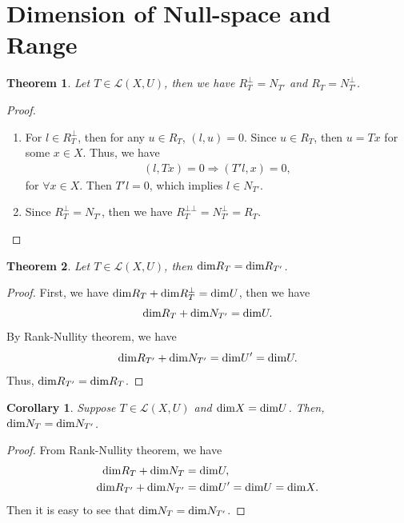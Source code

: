 \documentclass[11pt]{book}
\newtheorem{theorem}{Theorem}[chapter]
\newtheorem{corollary}{Corollary}[theorem]
\theoremstyle{definition}
\numberwithin{equation}{chapter}
\begin{document}
\section{Dimension of Null-space and Range}
\begin{theorem}\label{theorem_371}
Let $T\in \mathscr{L}(X,U)$, then we have $R_T^\bot = N_{T'}$ and $R_T = N_{T'}^\bot$.
\end{theorem}
\begin{proof}
~\begin{enumerate}[label=(\alph*)]
    \item For $l\in R_T^\bot$, then for any $u\in R_T$, $(l,u) = 0$. Since $u\in R_T$, then $u = T x$ for some $x\in X$. Thus, we have
    \begin{align*}
        (l, T x) = 0 \Rightarrow (T' l, x) = 0,
    \end{align*}
    for $\forall x\in X$. Then $T' l = 0$, which implies $l\in N_{T'}$.
    \item Since $R_T^\bot = N_{T'}$, then we have $R_T^{\bot\bot} = N_{T'}^\bot = R_T$.
\end{enumerate}
\end{proof}

\medskip

\begin{theorem}
Let $T\in \mathscr{L}(X,U)$, then ${\rm dim}R_T = {\rm dim}R_{T'}$.
\end{theorem}
\begin{proof}
First, we have ${\rm dim}R_T + {\rm dim}R_T^\bot = {\rm dim}U$, then we have $${\rm dim}R_T + {\rm dim}N_{T'} = {\rm dim}U.$$
By Rank-Nullity theorem, we have $${\rm dim}R_{T'} + {\rm dim}N_{T'} = {\rm dim}U' = {\rm dim}U.$$ 
Thus, ${\rm dim}R_{T'} = {\rm dim}R_{T}$.
\end{proof}

\medskip

\begin{corollary}
Suppose $T\in \mathscr{L}(X,U)$ and ${\rm dim} X = {\rm dim} U$. Then, ${\rm dim}N_T = {\rm dim}N_{T'}$.
\end{corollary}
\begin{proof}
From Rank-Nullity theorem, we have 
\begin{align*}
    {\rm dim}R_T + {\rm dim}N_T & = {\rm dim}U, \\
    {\rm dim}R_{T'} + {\rm dim}N_{T'} & = {\rm dim}U' = {\rm dim}U = {\rm dim}X.
\end{align*}
Then it is easy to see that ${\rm dim}N_T = {\rm dim}N_{T'}$.
\end{proof}
\end{document}
